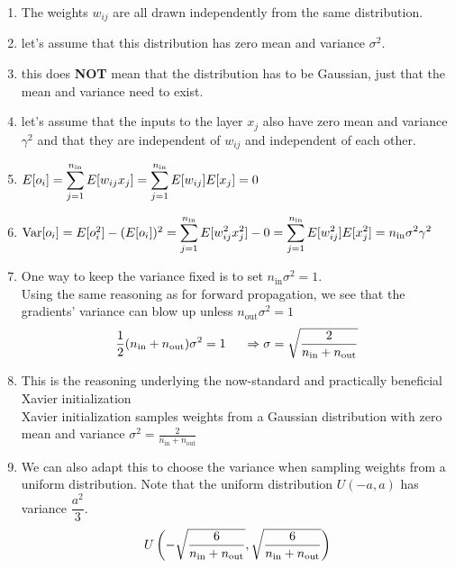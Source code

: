 \begin{enumerate}[itemsep=0.2cm]
    \item The weights $w_{ij}$ are all drawn independently from the same distribution.
    
    \item let’s assume that this distribution has zero mean and variance $\sigma^2$.
    
    \item this does \textbf{NOT} mean that the distribution has to be Gaussian, just that the mean and variance need to exist.

    \item let’s assume that the inputs to the layer $x_j$ also have zero mean and variance $\gamma^2$ and that they are independent of $w_{ij}$ and independent of each other.

    \item[] 
    $
        \hfill
        E[o_i] 
        = \dsum_{j=1}^{n_\textrm{in}} E[w_{ij} x_j]
        = \dsum_{j=1}^{n_\textrm{in}} E[w_{ij}] E[x_j]
        = 0 
        \hfill
    $

    \item[] 
    $
        \hfill
        \textrm{Var}[o_i] 
        = E[o_i^2] - (E[o_i])^2
        = \dsum_{j=1}^{n_\textrm{in}} E[w^2_{ij} x^2_j] - 0
        = \dsum_{j=1}^{n_\textrm{in}} E[w^2_{ij}] E[x^2_j] 
        = n_\textrm{in} \sigma^2 \gamma^2
        \hfill
    $

    \item One way to keep the variance fixed is to set $n_\textrm{in} \sigma^2 = 1$. \\
    Using the same reasoning as for forward propagation, we see that the gradients’ variance can blow up unless $n_\textrm{out} \sigma^2 = 1$
    \[
        \hfill
        \dfrac{1}{2} (n_\textrm{in} + n_\textrm{out}) \sigma^2 = 1 
        \hspace{0.5cm}
        \Rightarrow
        \sigma = \sqrt{\dfrac{2}{n_\textrm{in} + n_\textrm{out}}}
        \hfill
    \]

    \item This is the reasoning underlying the now-standard and practically beneficial Xavier initialization\\
    Xavier initialization samples weights from a Gaussian distribution with zero mean and variance $\sigma^2 = \frac{2}{n_\textrm{in} + n_\textrm{out}}$

    \item We can also adapt this to choose the variance when sampling weights from a uniform distribution. Note that the uniform distribution $U(-a, a)$ has variance $\dfrac{a^2}{3}$.
    \[
        \hfill
        U\dParenBrac{
            -\sqrt{\dfrac{6}{n_\textrm{in} + n_\textrm{out}}}, 
            \sqrt{\dfrac{6}{n_\textrm{in} + n_\textrm{out}}}
        }
        \hfill
    \]
\end{enumerate}



